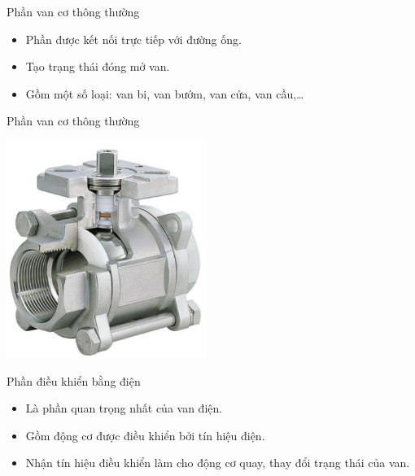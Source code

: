 \documentclass[20pt]{beamer}
\begin{document}
\begin{frame}{Phần van cơ thông thường}
\begin{itemize}
\justifying
	\item Phần được kết nối trực tiếp với đường ống.
	\item Tạo trạng thái đóng mở van.
	\item Gồm một số loại: van bi, van bướm, van cửa, van cầu,\ldots
\end{itemize}
\end{frame}
\begin{frame}{Phần van cơ thông thường}
\vspace{-.5cm}
\begin{center}
	\includegraphics[scale=.7]{images/phan-co-van-bi.png} 
\end{center}
\end{frame}
\begin{frame}{Phần điều khiển bằng điện}
	\begin{itemize}
		\item Là phần quan trọng nhất của van điện.
		\item Gồm động cơ được điều khiển bởi tín hiệu điện.
		
		\item Nhận tín hiệu điều khiển làm cho động cơ quay, thay đổi trạng thái của van.
	\end{itemize}
\end{frame}
\end{document}
